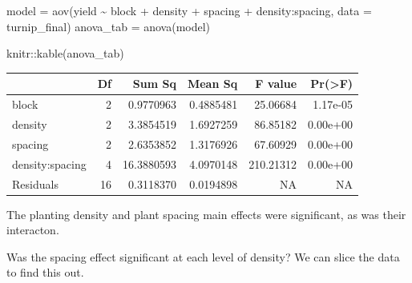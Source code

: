 \documentclass[
]{book}
\newenvironment{Shaded}{\begin{snugshade}}{\end{snugshade}}
\newcommand{\AttributeTok}[1]{\textcolor[rgb]{0.77,0.63,0.00}{#1}}
\newcommand{\FunctionTok}[1]{\textcolor[rgb]{0.00,0.00,0.00}{#1}}
\newcommand{\NormalTok}[1]{#1}
\newcommand{\OtherTok}[1]{\textcolor[rgb]{0.56,0.35,0.01}{#1}}
\newcommand{\SpecialCharTok}[1]{\textcolor[rgb]{0.00,0.00,0.00}{#1}}
\newcommand{\StringTok}[1]{\textcolor[rgb]{0.31,0.60,0.02}{#1}}
\begin{document}
\begin{Shaded}
\begin{Highlighting}[]
\NormalTok{model }\OtherTok{=} \FunctionTok{aov}\NormalTok{(yield }\SpecialCharTok{\textasciitilde{}}\NormalTok{ block }\SpecialCharTok{+}\NormalTok{ density }\SpecialCharTok{+}\NormalTok{ spacing }\SpecialCharTok{+}\NormalTok{ density}\SpecialCharTok{:}\NormalTok{spacing, }\AttributeTok{data =}\NormalTok{ turnip\_final)}
\NormalTok{anova\_tab }\OtherTok{=} \FunctionTok{anova}\NormalTok{(model)}

\NormalTok{knitr}\SpecialCharTok{::}\FunctionTok{kable}\NormalTok{(anova\_tab)}
\end{Highlighting}
\end{Shaded}

\begin{tabular}{l|r|r|r|r|r}
\hline
  & Df & Sum Sq & Mean Sq & F value & Pr(>F)\\
\hline
block & 2 & 0.9770963 & 0.4885481 & 25.06684 & 1.17e-05\\
\hline
density & 2 & 3.3854519 & 1.6927259 & 86.85182 & 0.00e+00\\
\hline
spacing & 2 & 2.6353852 & 1.3176926 & 67.60929 & 0.00e+00\\
\hline
density:spacing & 4 & 16.3880593 & 4.0970148 & 210.21312 & 0.00e+00\\
\hline
Residuals & 16 & 0.3118370 & 0.0194898 & NA & NA\\
\hline
\end{tabular}

The planting density and plant spacing main effects were significant, as was their interacton.

Was the spacing effect significant at each level of density? We can slice the data to find this out.

\begin{Shaded}
\end{Shaded}
\end{document}
